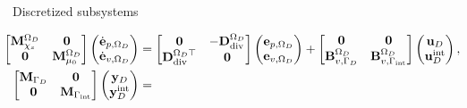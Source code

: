\documentclass[aspectratio=169]{ISAE-Beamer}
\DeclareMathOperator*{\grad}{grad}
\renewcommand{\div}{\operatorname{div}}
\begin{document}
\begin{frame}{Discretized subsystems}

\begin{tcolorbox}[colframe=blue,title=Subdomain $\Omega_D$ (I.B.P. $\grad$),  coltitle=white]%
	\setlength{\abovedisplayskip}{1pt}
	\setlength{\belowdisplayskip}{1pt}
	\begin{equation*}
	\hspace*{-0.3cm}
	\begin{aligned}
	\begin{bmatrix}
	\mathbf{M}_{\chi_s}^{\Omega_D} & \mathbf{0} \\
	\mathbf{0} & \mathbf{M}_{\mu_0}^{\Omega_D} \\
	\end{bmatrix}
	\begin{pmatrix}
	\dot{\mathbf{e}}_{p, \Omega_D} \\
	\dot{\mathbf{e}}_{v, \Omega_D} \\
	\end{pmatrix}
	&= \begin{bmatrix}
	\mathbf{0} & -\mathbf{D}_{\div}^{\Omega_D}\\
	\mathbf{D}_{\div}^{\Omega_D \top} & \mathbf{0}\\
	\end{bmatrix}
	\begin{pmatrix}
	{\mathbf{e}}_{p, \Omega_D}\\
	{\mathbf{e}}_{v, \Omega_D}\\
	\end{pmatrix} + \begin{bmatrix}
	\mathbf{0} & \mathbf{0}\\
	\mathbf{B}_{v, \Gamma_{D}}^{\Omega_D} & \mathbf{B}_{v, \Gamma_{\text{int}}}^{\Omega_D}\\
	\end{bmatrix}
	\begin{pmatrix}
	\mathbf{u}_D \\
	\mathbf{u}_D^{\text{int}}
	\end{pmatrix}, \\
	\begin{bmatrix}
	\mathbf{M}_{\Gamma_D} & \mathbf{0} \\
	\mathbf{0} & \mathbf{M}_{\Gamma_{\text{int}}} \\
	\end{bmatrix}
	\begin{pmatrix}
	\mathbf{y}_D \\
	\mathbf{y}_D^{\text{int}}
	\end{pmatrix} &=

\end{aligned}
\end{equation*}
\end{tcolorbox}
\end{frame}
\end{document}
